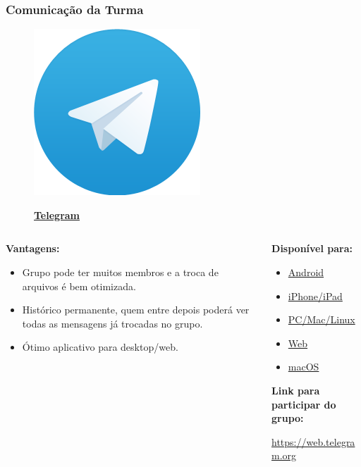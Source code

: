 \begin{frame}[t]\frametitle{Comunicação da Turma}

  \begin{figure}[htb]
    \centering{}
    \includegraphics[width=0.07\paperwidth]{img/sec03/telegram.png}

    \textbf{\href{https://telegram.org}{Telegram}}
  \end{figure}

  \begin{columns}
    \begin{column}{0.45\linewidth}
      \textbf{Vantagens:}
      \begin{itemize}
        \justifying{}
        \setlength\itemsep{1em}
        \item Grupo pode ter muitos membros e a troca de arquivos é bem otimizada.
        \item Histórico permanente, quem entre depois poderá ver todas as mensagens já trocadas no grupo.
        \item Ótimo aplicativo para desktop/web.
      \end{itemize}
    \end{column}

    \begin{column}{0.45\linewidth}
      \textbf{Disponível para:}
      \begin{itemize}
        \justifying{}
        \item \href{https://telegram.org/dl/android}{Android}
        \item \href{https://telegram.org/dl/ios}{iPhone/iPad}
        \item \href{https://desktop.telegram.org}{PC/Mac/Linux}
        \item \href{https://web.telegram.org}{Web}
        \item \href{https://macos.telegram.org}{macOS}
      \end{itemize}

      \textbf{Link para participar do grupo:}

      \href{https://web.telegram.org}{https://web.telegram.org}
    \end{column}
  \end{columns}

\end{frame}
